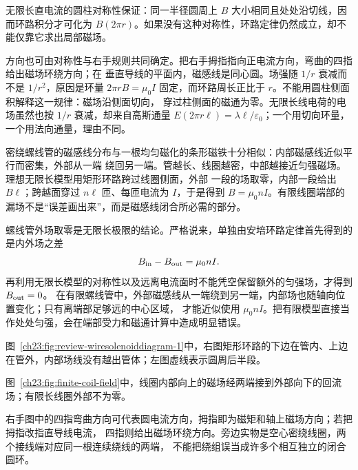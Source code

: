 {无限长直电流的圆柱对称性保证：同一半径圆周上 $B$ 大小相同且处处沿切线，因而环路积分才可化为
$B(2\pi r)$。如果没有这种对称性，环路定律仍然成立，却不能仅靠它求出局部磁场。

方向也可由对称性与右手规则共同确定。把右手拇指指向正电流方向，弯曲的四指给出磁场环绕方向；在
垂直导线的平面内，磁感线是同心圆。场强随 $1/r$ 衰减而不是 $1/r^2$，原因是环量
$2\pi rB=\mu_0I$ 固定，而环路周长正比于 $r$。不能用圆柱侧面积解释这一规律：磁场沿侧面切向，
穿过柱侧面的磁通为零。无限长线电荷的电场虽然也按 $1/r$ 衰减，却来自高斯通量
$E(2\pi r\ell)=\lambda\ell/\varepsilon_0$；一个用切向环量，一个用法向通量，理由不同。

密绕螺线管的磁感线分布与一根均匀磁化的条形磁铁十分相似：内部磁感线近似平行而密集，外部从一端
绕回另一端。管越长、线圈越密，中部越接近匀强磁场。理想无限长模型用矩形环路跨过线圈侧面，外部
一段的场取零，内部一段给出 $B\ell$；跨越面穿过 $n\ell$ 匝、每匝电流为 $I$，于是得到
$B=\mu_0nI$。有限线圈端部的漏场不是“误差画出来”，而是磁感线闭合所必需的部分。

螺线管外场取零是无限长极限的结论。严格说来，单独由安培环路定律首先得到的是内外场之差
\begin{equation}
  B_{\rm in}-B_{\rm out}=\mu_0nI.
\end{equation}
再利用无限长模型的对称性以及远离电流面时不能凭空保留额外的匀强场，才得到 $B_{\rm out}=0$。
在有限螺线管中，外部磁感线从一端绕到另一端，内部场也随轴向位置变化；只有离端部足够远的中心区域，
才能近似使用 $\mu_0nI$。把有限模型直接当作处处匀强，会在端部受力和磁通计算中造成明显错误。

图~\ref{ch23:fig:review-wiresolenoiddiagram-1}中，右图矩形环路的下边在管内、上边在管外，内部场线没有越出管体；左图虚线表示圆周后半段。
\par\noindent\begin{minipage}{\linewidth}
\wireSolenoidDiagram
{}
\end{minipage}\par\medskip

图~\ref{ch23:fig:finite-coil-field}中，线圈内部向上的磁场经两端接到外部向下的回流场；有限长线圈外部不为零。
\par\noindent\begin{minipage}{\linewidth}
\finiteCoilFieldDiagram
{}
\end{minipage}\par\medskip
\handSolenoidContext
右手图中的四指弯曲方向可代表圆电流方向，拇指即为磁矩和轴上磁场方向；若把拇指改指直导线电流，
四指则给出磁场环绕方向。旁边实物是空心密绕线圈，两个接线端对应同一根连续绕线的两端，
不能把绕组误当成许多个相互独立的闭合圆环。


}
